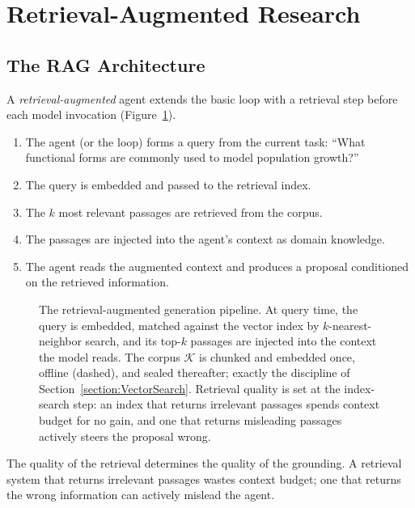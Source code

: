 \section{Retrieval-Augmented Research}
\label{section:RAG}

\subsection{The RAG Architecture}

A \emph{retrieval-augmented} agent extends the basic loop with a retrieval step before each model invocation (Figure~\ref{figure:RAGPipeline}).

\begin{enumerate}
\item The agent (or the loop) forms a query from the current task: ``What functional forms are commonly used to model population growth?''
\item The query is embedded and passed to the retrieval index.
\item The $k$ most relevant passages are retrieved from the corpus.
\item The passages are injected into the agent's context as domain knowledge.
\item The agent reads the augmented context and produces a proposal conditioned on the retrieved information.
\end{enumerate}

\begin{figure}[htb!]
\begin{center}

\caption{The retrieval-augmented generation pipeline.
At query time, the query is embedded, matched against the vector index by $k$-nearest-neighbor search, and its top-$k$ passages are injected into the context the model reads.
The corpus $\mathcal{K}$ is chunked and embedded once, offline (dashed), and sealed thereafter; exactly the discipline of Section~\ref{section:VectorSearch}.
Retrieval quality is set at the index-search step: an index that returns irrelevant passages spends context budget for no gain, and one that returns misleading passages actively steers the proposal wrong.}
\label{figure:RAGPipeline}
\end{center}
\end{figure}

The quality of the retrieval determines the quality of the grounding.
A retrieval system that returns irrelevant passages wastes context budget; one that returns the wrong information can actively mislead the agent.

